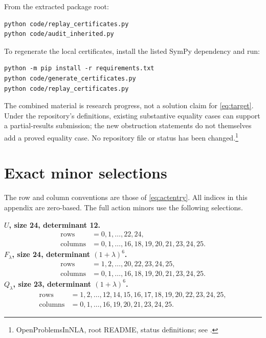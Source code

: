 \documentclass[11pt]{article}
\theoremstyle{remark}\newtheorem{remark}[theorem]{Remark}
\begin{document}
From the extracted package root:
\begin{verbatim}
python code/replay_certificates.py
python code/audit_inherited.py
\end{verbatim}
\begin{samepage}
To regenerate the local certificates, install the listed SymPy dependency and run:
\begin{verbatim}
python -m pip install -r requirements.txt
python code/generate_certificates.py
python code/replay_certificates.py
\end{verbatim}
\end{samepage}
The combined material is research progress, not a solution claim for \eqref{eq:target}. Under the repository's definitions, existing substantive equality cases can support a partial-results submission; the new obstruction statements do not themselves add a proved equality case. No repository file or status has been changed.\footnote{OpenProblemsInNLA, root README, status definitions; see \cite{status}.}

\appendix
\section{Exact minor selections}\label{app:minors}
The row and column conventions are those of \eqref{eq:actentry}. All indices in this appendix are zero-based. The full action minors use the following selections.

\textbf{$U$, size 24, determinant 12.}
\begin{align*}
\text{rows}&=0,1,\ldots,22,24,\\
\text{columns}&=0,1,\ldots,16,18,19,20,21,23,24,25.
\end{align*}
\textbf{$F_\lambda$, size 24, determinant $(1+\lambda)^6$.}
\begin{align*}
\text{rows}&=1,2,\ldots,20,22,23,24,25,\\
\text{columns}&=0,1,\ldots,16,18,19,20,21,23,24,25.
\end{align*}
\textbf{$Q_\lambda$, size 23, determinant $(1+\lambda)^6$.}
\begin{align*}
\text{rows}&=1,2,\ldots,12,14,15,16,17,18,19,20,22,23,24,25,\\
\text{columns}&=0,1,\ldots,16,19,20,21,23,24,25.
\end{align*}
\end{document}
